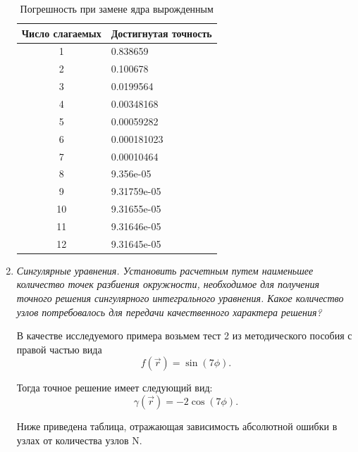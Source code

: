 \documentclass[12pt, a4paper]{article}
\begin{document}
\begin{enumerate}
		\begin{table}[H]
			\caption{Погрешность при замене ядра вырожденным}
			\centering
			\begin{tabular}{|c|l|}
				\hline
				Число слагаемых & Достигнутая точность \\ \hline
				1        &         0.838659         \\ \hline
				2        &         0.100678         \\ \hline
				3        &         0.0199564         \\ \hline
				4        &         0.00348168         \\ \hline
				5        &         0.00059282         \\ \hline
				6        &         0.000181023         \\ \hline
				7        &         0.00010464         \\ \hline
				8        &         9.356e-05         \\ \hline
				9        &         9.31759e-05         \\ \hline
				10        &         9.31655e-05         \\ \hline
				11        &         9.31646e-05         \\ \hline
				12        &         9.31645e-05         \\ \hline
			\end{tabular}
		\end{table}
		
		\item \textit{Сингулярные уравнения. Установить расчетным путем наименьшее количество точек разбиения окружности, необходимое для получения точного решения сингулярного интегрального уравнения. Какое количество узлов потребовалось для передачи качественного характера решения?}
		
		В качестве исследуемого примера возьмем тест 2 из методического пособия с правой частью вида
		\[
		f(\vec{r}) = \sin(7\phi).
		\]
		
		Тогда точное решение имеет следующий вид:
		\[
		\gamma(\vec{r}) = -2 \cos(7\phi).
		\]
		
		Ниже приведена таблица, отражающая зависимость абсолютной ошибки в узлах от количества узлов N.
		

\end{enumerate}
\end{document}
